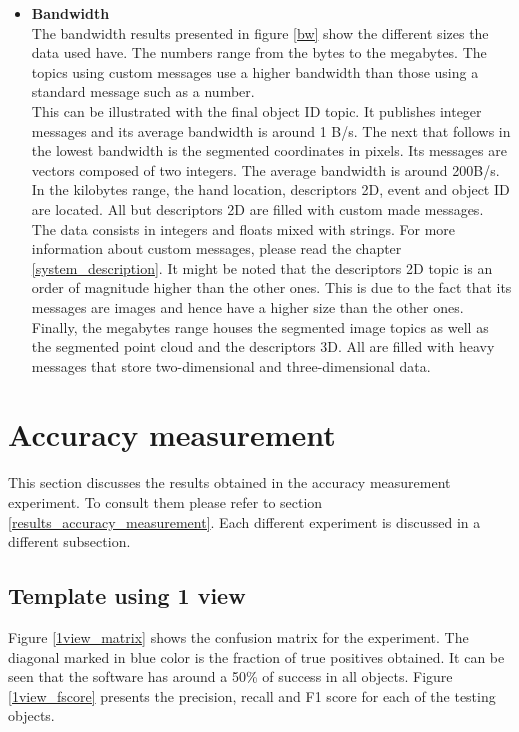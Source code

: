 \begin{itemize}
			\\

			\item{\textbf{Bandwidth}}\\

			The  bandwidth results presented in figure \ref{bw} show the different sizes the data used have. 
			The numbers range from the bytes to the megabytes. 
			The topics using custom messages use a higher bandwidth than those using a standard message such as a number. 
			\\

			This can be illustrated with the final object ID topic. 
			It publishes integer messages and its average bandwidth is around 1 B/s. 
			The next that follows in the lowest bandwidth is the segmented coordinates in pixels. 
			Its messages are vectors composed of two integers. 
			The average bandwidth is around 200B/s. 
			\\

			In the kilobytes range, the hand location, descriptors 2D, event and object ID are located. 
			All but descriptors 2D are filled with custom made messages. 
			The data consists in integers and floats mixed with strings. 
			For more information about custom messages, please read the chapter \ref{system_description}.
			It might be noted that the descriptors 2D topic is an order of magnitude higher than the other ones. 
			This is due to the fact that its messages are images and hence have a higher size than the other ones. 
			\\

			Finally, the megabytes range houses the segmented image topics as well as the segmented point cloud and the descriptors 3D. 
			All are filled with heavy messages that store two-dimensional and three-dimensional data. 
		\end{itemize}

\section{Accuracy measurement}
	This section discusses the results obtained in the accuracy measurement experiment. 
	To consult them please refer to section \ref{results_accuracy_measurement}.
	Each different experiment is discussed in a different subsection.


	\subsection{Template using 1 view}
	Figure \ref{1view_matrix} shows the confusion matrix for the experiment. 
	The diagonal marked in blue color is the fraction of true positives obtained. 
	It can be seen that the software has around a 50\% of success in all objects. 
	Figure \ref{1view_fscore} presents the precision, recall and F1 score for each of the testing objects. 
	\\

